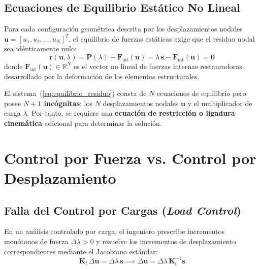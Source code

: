 \documentclass[11pt,letterpaper]{article}
\begin{document}
\subsection{Ecuaciones de Equilibrio Estático No Lineal}

Para cada configuración geométrica descrita por los desplazamientos nodales $\mathbf{u} = [u_1, u_2, \dots, u_N]^T$, el equilibrio de fuerzas estáticas exige que el residuo nodal sea idénticamente nulo:
\begin{equation}
    \label{eq:equilibrio_residuo}
    \mathbf{r}(\mathbf{u}, \lambda) = \mathbf{P}(\lambda) - \mathbf{F}_{\text{int}}(\mathbf{u}) = \lambda \, \mathbf{s} - \mathbf{F}_{\text{int}}(\mathbf{u}) = \mathbf{0}
\end{equation}
donde $\mathbf{F}_{\text{int}}(\mathbf{u}) \in \mathbb{R}^N$ es el vector no lineal de fuerzas internas restauradoras desarrollado por la deformación de los elementos estructurales.

El sistema~(\ref{eq:equilibrio_residuo}) consta de $N$ ecuaciones de equilibrio pero posee \textbf{$N+1$ incógnitas}: los $N$ desplazamientos nodales $\mathbf{u}$ y el multiplicador de carga $\lambda$. Por tanto, se requiere una \textbf{ecuación de restricción o ligadura cinemática} adicional para determinar la solución.

\section{Control por Fuerza vs. Control por Desplazamiento}

\subsection{Falla del Control por Cargas (\textit{Load Control})}

En un análisis controlado por carga, el ingeniero prescribe incrementos monótonos de fuerza $\Delta \lambda > 0$ y resuelve los incrementos de desplazamiento correspondientes mediante el Jacobiano estándar:
\begin{equation}
    \mathbf{K}_t \, \Delta \mathbf{u} = \Delta \lambda \, \mathbf{s} \implies \Delta \mathbf{u} = \Delta \lambda \, \mathbf{K}_t^{-1} \mathbf{s}
\end{equation}
\end{document}
